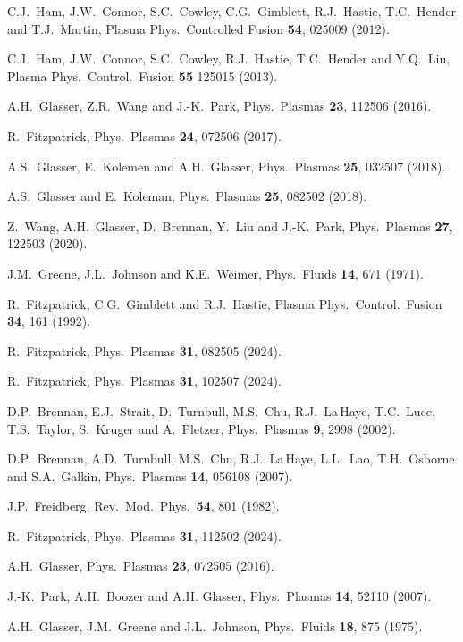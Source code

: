 \documentclass[12pt,prb,aps]{revtex4-1}
\begin{document}
\begin{thebibliography}{99}
 C.J.~Ham, J.W.~Connor, S.C.~Cowley, C.G.~Gimblett, R.J.~Hastie, T.C.~Hender and T.J.~Martin, Plasma Phys.\ Controlled Fusion {\bf 54}, 025009 (2012). 

 C.J.~Ham, J.W.~Connor, S.C.~Cowley, R.J.~Hastie, T.C.~Hender and Y.Q.~Liu, Plasma Phys.\ Control.\ Fusion {\bf 55} 125015 (2013).

 A.H.~Glasser, Z.R.~Wang and J.-K.~Park, Phys.\ Plasmas {\bf 23}, 112506 (2016).

 R.~Fitzpatrick, Phys.\ Plasmas {\bf 24}, 072506 (2017). 

 A.S.~Glasser, E.~Kolemen and A.H.~Glasser, Phys.\ Plasmas {\bf 25}, 032507 (2018).

 A.S.~Glasser and E.~Koleman, Phys.\ Plasmas {\bf 25}, 082502 (2018). 

 Z.~Wang, A.H.~Glasser, D.~Brennan, Y.~Liu and J.-K.~Park, Phys.\ Plasmas {\bf 27}, 122503 (2020).

 J.M.~Greene, J.L.~Johnson and K.E.~Weimer,  Phys.\  Fluids  {\bf 14}, 671 (1971).

 R.~Fitzpatrick, C.G.~Gimblett and R.J.~Hastie, Plasma Phys.\ Control.\ Fusion {\bf 34}, 161 (1992). 

 R.~Fitzpatrick, Phys.\ Plasmas {\bf 31}, 082505 (2024).

 R.~Fitzpatrick, Phys.\ Plasmas {\bf 31}, 102507 (2024).

 D.P.~Brennan, E.J.~Strait, D.~Turnbull, M.S.~Chu, R.J.~La\,Haye, T.C.~Luce, T.S.~Taylor, S.~Kruger and A.~Pletzer, Phys.\ Plasmas {\bf 9}, 2998 (2002).

 D.P.~Brennan, A.D.~Turnbull, M.S.~Chu, R.J.~La\,Haye, L.L.~Lao, T.H.~Osborne and S.A.~Galkin, Phys.\ Plasmas {\bf 14}, 056108 (2007). 

 J.P.~Freidberg, Rev.\ Mod.\ Phys.\ {\bf 54},  801 (1982).

 R.~Fitzpatrick, Phys.\ Plasmas {\bf 31}, 112502 (2024).

 A.H.~Glasser, Phys.\ Plasmas {\bf 23}, 072505 (2016).

 J.-K.~Park, A.H.~Boozer and A.H. Glasser, Phys.\  Plasmas {\bf 14}, 52110 (2007).

 A.H.~Glasser, J.M.~Greene and J.L.~Johnson, Phys.\ Fluids {\bf 18}, 875 (1975).


\end{thebibliography}
\end{document}
